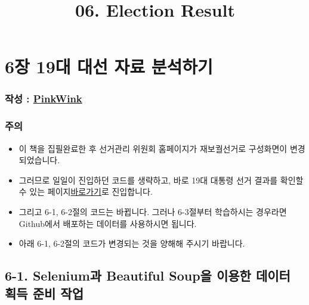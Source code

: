 \documentclass[11pt]{article}
\title{06. Election Result}
\providecommand{\tightlist}{%
      \setlength{\itemsep}{0pt}\setlength{\parskip}{0pt}}
\begin{document}
    
    
    \maketitle
    
    

    
    \section{6장 19대 대선 자료
분석하기}\label{uxc7a5-19uxb300-uxb300uxc120-uxc790uxb8cc-uxbd84uxc11duxd558uxae30}

\subsubsection{\texorpdfstring{작성 :
\href{http://pinkwink.kr}{PinkWink}}{작성 : PinkWink}}\label{uxc791uxc131-pinkwink}

\subsubsection{주의}\label{uxc8fcuxc758}

\begin{itemize}
\tightlist
\item
  이 책을 집필완료한 후 선거관리 위원회 홈페이지가 재보궐선거로
  구성화면이 변경되었습니다.
\item
  그러므로 일일이 진입하던 코드를 생략하고, 바로 19대 대통령 선거 결과를
  확인할 수 있는
  페이지\href{http://info.nec.go.kr/main/showDocument.xhtml?electionId=0000000000\&topMenuId=VC\&secondMenuId=VCCP09}{바로가기}로
  진입합니다.
\item
  그리고 6-1, 6-2절의 코드는 바뀝니다. 그러나 6-3절부터 학습하시는
  경우라면 Github에서 배포하는 데이터를 사용하시면 됩니다.
\item
  아래 6-1, 6-2절의 코드가 변경되는 것을 양해해 주시기 바랍니다.
\end{itemize}

\subsection{6-1. Selenium과 Beautiful Soup을 이용한 데이터 획득 준비
작업}\label{seleniumuxacfc-beautiful-soupuxc744-uxc774uxc6a9uxd55c-uxb370uxc774uxd130-uxd68duxb4dd-uxc900uxbe44-uxc791uxc5c5}
\end{document}
